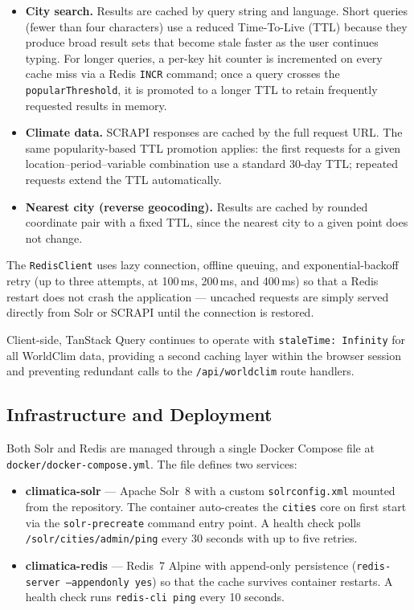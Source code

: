 \begin{itemize}
  \item \textbf{City search.} Results are cached by query string and language.
    Short queries (fewer than four characters) use a reduced Time-To-Live (TTL)
    because they produce broad result sets that become stale faster as the user
    continues typing. For longer queries, a per-key hit counter is incremented
    on every cache miss via a Redis \texttt{INCR} command; once a query crosses
    the \texttt{popularThreshold}, it is promoted to a longer TTL to retain
    frequently requested results in memory.

  \item \textbf{Climate data.} SCRAPI responses are cached by the full
    request URL. The same popularity-based TTL promotion applies: the first
    requests for a given location--period--variable combination use a standard
    30-day TTL; repeated requests extend the TTL automatically.

  \item \textbf{Nearest city (reverse geocoding).} Results are cached by
    rounded coordinate pair with a fixed TTL, since the nearest city to a
    given point does not change.
\end{itemize}

The \texttt{RedisClient} uses lazy connection, offline queuing, and
exponential-backoff retry (up to three attempts, at 100\,ms, 200\,ms, and
400\,ms) so that a Redis restart does not crash the application --- uncached
requests are simply served directly from Solr or SCRAPI until the connection
is restored.

Client-side, TanStack Query continues to operate with
\texttt{staleTime:~Infinity} for all WorldClim data, providing a second
caching layer within the browser session and preventing redundant calls to
the \texttt{/api/worldclim} route handlers.

\subsection{Infrastructure and Deployment}\label{APP_ARCH_INFRA}

Both Solr and Redis are managed through a single Docker Compose file at
\texttt{docker/docker-compose.yml}. The file defines two services:

\begin{itemize}
  \item \textbf{climatica-solr} --- Apache Solr~8 with a custom
    \texttt{solrconfig.xml} mounted from the repository. The container
    auto-creates the \texttt{cities} core on first start via the
    \texttt{solr-precreate} command entry point. A health check polls
    \texttt{/solr/cities/admin/ping} every 30 seconds with up to five
    retries.
  \item \textbf{climatica-redis} --- Redis~7 Alpine with append-only
    persistence (\texttt{redis-server --appendonly yes}) so that the
    cache survives container restarts. A health check runs
    \texttt{redis-cli ping} every 10 seconds.
\end{itemize}

